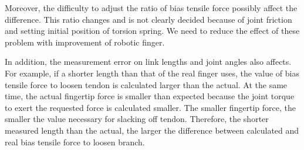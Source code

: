 \documentclass{llncs}
\begin{document}
Moreover, the difficulty to adjust the ratio of bias tensile force possibly affect the difference.
This ratio changes and is not clearly decided because of joint friction and setting initial position of torsion spring.
We need to reduce the effect of these problem with improvement of robotic finger.

In addition, the measurement error on link lengths and joint angles also affects.
For example, if a shorter length than that of the real finger uses, 
the value of bias tensile force to loosen tendon is calculated larger than the actual.
At the same time, the actual fingertip force is smaller than expected 
because the joint torque to exert the requested force is calculated smaller.
The smaller fingertip force, the smaller the value necessary for slacking off tendon.
Therefore, the shorter measured length than the actual, 
the larger the difference between calculated and real bias tensile force to loosen branch. 


\end{document}
